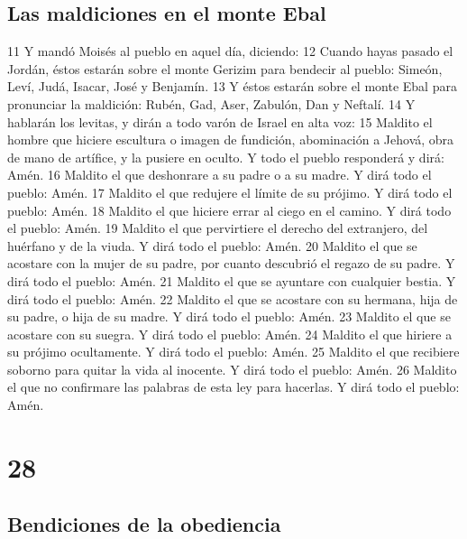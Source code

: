 \section{Las maldiciones en el monte Ebal}

11 Y mandó Moisés al pueblo en aquel día, diciendo:
12 Cuando hayas pasado el Jordán, éstos estarán sobre el monte Gerizim para bendecir al pueblo: Simeón, Leví, Judá, Isacar, José y Benjamín.
13 Y éstos estarán sobre el monte Ebal para pronunciar la maldición: Rubén, Gad, Aser, Zabulón, Dan y Neftalí.
14 Y hablarán los levitas, y dirán a todo varón de Israel en alta voz:
15 Maldito el hombre que hiciere escultura o imagen de fundición, abominación a Jehová, obra de mano de artífice, y la pusiere en oculto. Y todo el pueblo responderá y dirá: Amén.
16 Maldito el que deshonrare a su padre o a su madre. Y dirá todo el pueblo: Amén.
17 Maldito el que redujere el límite de su prójimo. Y dirá todo el pueblo: Amén.
18 Maldito el que hiciere errar al ciego en el camino. Y dirá todo el pueblo: Amén. 
19 Maldito el que pervirtiere el derecho del extranjero, del huérfano y de la viuda. Y dirá todo el pueblo: Amén.
20 Maldito el que se acostare con la mujer de su padre, por cuanto descubrió el regazo de su padre. Y dirá todo el pueblo: Amén.
21 Maldito el que se ayuntare con cualquier bestia. Y dirá todo el pueblo: Amén.
22 Maldito el que se acostare con su hermana, hija de su padre, o hija de su madre. Y dirá todo el pueblo: Amén.
23 Maldito el que se acostare con su suegra. Y dirá todo el pueblo: Amén.
24 Maldito el que hiriere a su prójimo ocultamente. Y dirá todo el pueblo: Amén.
25 Maldito el que recibiere soborno para quitar la vida al inocente. Y dirá todo el pueblo: Amén.
26 Maldito el que no confirmare las palabras de esta ley para hacerlas. Y dirá todo el pueblo: Amén.

\chapter{28}


\section{Bendiciones de la obediencia}




